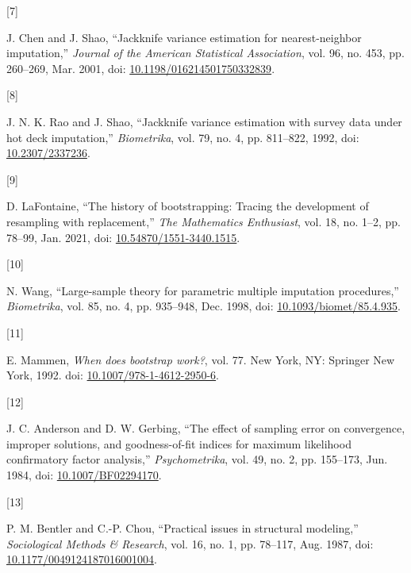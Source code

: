 \documentclass[
  letterpaper,
  DIV=11,
  numbers=noendperiod]{scrreprt}
\newlength{\cslhangindent}
\newlength{\csllabelwidth}
\newlength{\cslentryspacingunit} %
\newenvironment{CSLReferences}[2] %
 {%
  \setlength{\parindent}{0pt}
  \ifodd #1
  \let\oldpar\par
  \def\par{\hangindent=\cslhangindent\oldpar}
  \fi
  \setlength{\parskip}{#2\cslentryspacingunit}
 }%
 {}
\newcommand{\CSLLeftMargin}[1]{\parbox[t]{\csllabelwidth}{#1}}
\newcommand{\CSLRightInline}[1]{\parbox[t]{\linewidth - \csllabelwidth}{#1}\break}
\begin{document}
\begin{CSLReferences}{0}{0}
\leavevmode{}%
\CSLLeftMargin{{[}7{]} }%
\CSLRightInline{J. Chen and J. Shao, {``Jackknife variance estimation
for nearest-neighbor imputation,''} \emph{Journal of the American
Statistical Association}, vol. 96, no. 453, pp. 260--269, Mar. 2001,
doi:
\href{https://doi.org/10.1198/016214501750332839}{10.1198/016214501750332839}.}

\leavevmode{}%
\CSLLeftMargin{{[}8{]} }%
\CSLRightInline{J. N. K. Rao and J. Shao, {``Jackknife variance
estimation with survey data under hot deck imputation,''}
\emph{Biometrika}, vol. 79, no. 4, pp. 811--822, 1992, doi:
\href{https://doi.org/10.2307/2337236}{10.2307/2337236}.}

\leavevmode{}%
\CSLLeftMargin{{[}9{]} }%
\CSLRightInline{D. LaFontaine, {``The history of bootstrapping: Tracing
the development of resampling with replacement,''} \emph{The Mathematics
Enthusiast}, vol. 18, no. 1--2, pp. 78--99, Jan. 2021, doi:
\href{https://doi.org/10.54870/1551-3440.1515}{10.54870/1551-3440.1515}.}

\leavevmode{}%
\CSLLeftMargin{{[}10{]} }%
\CSLRightInline{N. Wang, {``Large-sample theory for parametric multiple
imputation procedures,''} \emph{Biometrika}, vol. 85, no. 4, pp.
935--948, Dec. 1998, doi:
\href{https://doi.org/10.1093/biomet/85.4.935}{10.1093/biomet/85.4.935}.}

\leavevmode{}%
\CSLLeftMargin{{[}11{]} }%
\CSLRightInline{E. Mammen, \emph{When does bootstrap work?}, vol. 77.
New York, NY: Springer New York, 1992. doi:
\href{https://doi.org/10.1007/978-1-4612-2950-6}{10.1007/978-1-4612-2950-6}.}

\leavevmode{}%
\CSLLeftMargin{{[}12{]} }%
\CSLRightInline{J. C. Anderson and D. W. Gerbing, {``The effect of
sampling error on convergence, improper solutions, and goodness-of-fit
indices for maximum likelihood confirmatory factor analysis,''}
\emph{Psychometrika}, vol. 49, no. 2, pp. 155--173, Jun. 1984, doi:
\href{https://doi.org/10.1007/BF02294170}{10.1007/BF02294170}.}

\leavevmode{}%
\CSLLeftMargin{{[}13{]} }%
\CSLRightInline{P. M. Bentler and C.-P. Chou, {``Practical issues in
structural modeling,''} \emph{Sociological Methods \& Research}, vol.
16, no. 1, pp. 78--117, Aug. 1987, doi:
\href{https://doi.org/10.1177/0049124187016001004}{10.1177/0049124187016001004}.}


\end{CSLReferences}
\end{document}
